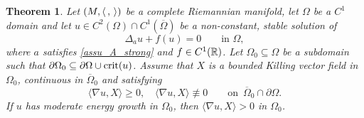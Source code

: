\documentclass[10 pt,a4paper]{article}
\newtheorem{theorem}[definition]{Theorem}
\theoremstyle{definition}
\begin{document}

\begin{theorem}\label{teo_monotonicity}
Let $(M, \langle \, , \, \rangle)$ be a complete Riemannian manifold, let $\Omega$ be a $C^1$ domain and let $u \in C^2(\Omega) \cap C^1(\overline{\Omega})$ be a non-constant, stable solution of
\[
\Delta_a u + f(u) = 0 \qquad \text{in } \Omega, 
\]	
where $a$ satisfies \eqref{assu_A_strong} and $f \in C^1(\mathbb R)$. Let $\Omega_0 \subseteq \Omega$ be a subdomain such that $\partial \Omega_0 \subseteq \partial \Omega \cup \mathrm{crit}(u)$. Assume that $X$ is a bounded Killing vector field in $\Omega_0$, continuous in $\overline\Omega_0$ and satisfying 
\begin{equation}\label{eq_bound_Kil}
\langle \nabla u, X \rangle \ge 0, \quad \langle \nabla u, X \rangle \not \equiv 0 \qquad \text{on } \, \overline{\Omega}_0 \cap \partial \Omega. 
\end{equation}
If $u$ has moderate energy growth in $\Omega_0$, then $\langle \nabla u, X \rangle > 0$ in $\Omega_0$.
\end{theorem}
\end{document}
